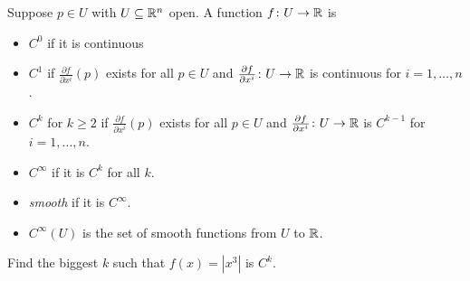 \begin{frame}

  \begin{definition}
    Suppose $p \in U$ with $U \subseteq \mathbb R^n$
    open. 
    A function $f \colon U \to \mathbb R$ is
    \begin{itemize}
      \item $C^0$ if it is continuous
      \item $C^1$ if $\frac{\partial f}{\partial x^i}(p)$ exists for all 
        $p \in U$ and $\frac{\partial f}{\partial x^i} \colon U \to \mathbb R$ is 
        continuous for $i = 1, \dots, n$.
      \item $C^k$ for $k \ge 2$ if $\frac{\partial f}{\partial x^i}(p)$ exists for all 
        $p \in U$ and $\frac{\partial f}{\partial x^i} \colon U \to \mathbb R$ is 
        $C^{k-1}$ for $i = 1, \dots, n$.
      \item $C^\infty$ if it is $C^k$ for all $k$.
      \item {\em smooth} if it is $C^\infty$.
      \item $C^\infty(U)$ is the set of smooth functions from $U$ to $\mathbb R$.
    \end{itemize}
    \begin{exercise}
      Find the biggest $k$ such that $f(x) = |x^3|$ is $C^k$.
    \end{exercise}
  \end{definition}
  

\end{frame}


